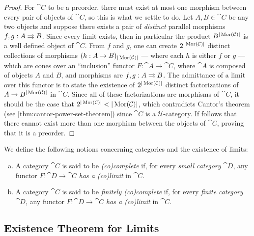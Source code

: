 \begin{proof}
For \(\cat C\) to be a preorder, there must exist at most one morphism between
every pair of objects of \(\cat C\), so this is what we settle to do. Let
\(A, B \in \cat C\) be any two objects and suppose there exists a pair of
\emph{distinct} parallel morphisms \(f, g: A \rightrightarrows B\). Since every limit
exists, then in particular the product \(B^{|\operatorname{Mor}(\mathcal C)|}\) is a well defined
object of \(\cat C\). From \(f\) and \(g\), one can create
\(2^{|\operatorname{Mor}(\mathcal C)|}\) distinct collections of morphisms
\((h: A \to B)_{|\operatorname{Mor}(\mathcal C)|}\) --- where each \(h\) is either \(f\) or \(g\)
--- which are cones over an ``inclusion'' functor \(F: \cat A \to \cat C\),
where \(\cat A\) is composed of objects \(A\) and \(B\), and morphisms are
\(f, g: A \rightrightarrows B\). The admittance of a limit over this functor is to state the
existence of \(2^{|\operatorname{Mor}(\mathcal C)|}\) distinct factorizations of
\(A \to B^{|\operatorname{Mor}(\mathcal C)|}\) in \(\cat C\). Since all of these factorizations
are morphisms of \(\cat C\), it should be the case that
\(2^{|\operatorname{Mor}(\mathcal C)|} < |\operatorname{Mor}(\mathcal C)|\), which contradicts Cantor's theorem (see
\cref{thm:cantor-power-set-theorem}) since \(\cat C\) is a
\(\mathcal{U}\)-category. If follows that there cannot exist more than one
morphism between the objects of \(\cat C\), proving that it is a preorder.
\end{proof}

\begin{definition}[Completeness]
\label{def:completeness-categories}
We define the following notions concerning categories and the existence of
limits:
\begin{enumerate}[(a)]\setlength\itemsep{0em}
\item A category \(\cat C\) is said to be \emph{(co)complete} if, for every
  \emph{small category} \(\cat D\), any functor \(F: \cat D \to \cat C\)
  \emph{has a (co)limit} in \(\cat C\).

\item A category \(\cat C\) is said to be \emph{finitely (co)complete} if, for
  every \emph{finite category} \(\cat D\), any functor \(F: \cat D \to \cat C\)
  \emph{has a (co)limit} in \(\cat C\).
\end{enumerate}
\end{definition}

\subsection{Existence Theorem for Limits}

